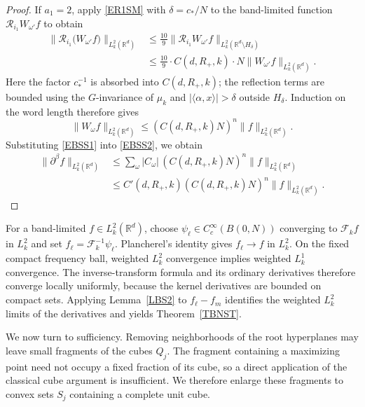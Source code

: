 \documentclass[12pt]{article}
\begin{document}
\begin{proof}
If $a_1=2$, apply \eqref{ER1SM} with $\delta=c_*/N$ to the band-limited function $\mathcal{R}_{i_1}W_{\omega'}f$ to obtain
\begin{align*}
\|\mathcal{R}_{i_1}\big(W_{\omega'} f\big)\|_{L_k^2(\mathbb{R}^d)}
&\le \frac{10}{9}\|\mathcal{R}_{i_1} W_{\omega'}  f\|_{L_k^2(\mathbb{R}^d\setminus H_\delta)} \\
&\le \frac{10}{9}\cdot C(d,R_+,k)\cdot N \|W_{\omega'}  f\|_{L_k^2(\mathbb{R}^d)}.
\end{align*}
Here the factor $c_*^{-1}$ is absorbed into $C(d,R_+,k)$; the reflection terms are bounded using the $G$-invariance of $\mu_k$ and $|\langle\alpha,x\rangle|>\delta$ outside $H_\delta$. Induction on the word length therefore gives
\begin{equation}\label{EBSS1}
\|W_\omega f\|_{L_k^2(\mathbb{R}^d)}\leq (C(d,R_+,k)N)^n\|f\|_{L_k^2(\mathbb{R}^d)}.
\end{equation}
Substituting \eqref{EBSS1} into \eqref{EBSS2}, we obtain
\[
\begin{aligned}
\|\partial^\beta f\|_{L_k^2(\mathbb{R}^d)}&\leq \sum_{\omega}|C_{\omega}|\,(C(d,R_+,k)N)^n\|f\|_{L_k^2(\mathbb{R}^d)}\\
&\leq C'(d,R_+,k)(C(d,R_+,k)N)^n\|f\|_{L_k^2(\mathbb{R}^d)}.
\end{aligned}
\]
\end{proof}

\begin{remark}
For a band-limited $f\in L_k^2(\mathbb{R}^d)$, choose $\psi_\ell\in C_c^\infty(B(0,N))$ converging to $\mathcal{F}_k f$ in $L_k^2$ and set $f_\ell=\mathcal{F}_k^{-1}\psi_\ell$. Plancherel's identity gives $f_\ell\to f$ in $L_k^2$. On the fixed compact frequency ball, weighted $L_k^2$ convergence implies weighted $L_k^1$ convergence. The inverse-transform formula and its ordinary derivatives therefore converge locally uniformly, because the kernel derivatives are bounded on compact sets. Applying Lemma~\ref{LBS2} to $f_\ell-f_m$ identifies the weighted $L_k^2$ limits of the derivatives and yields Theorem~\ref{TBNST}.
\end{remark}

We now turn to sufficiency. Removing neighborhoods of the root hyperplanes may leave small fragments of the cubes $Q_j$. The fragment containing a maximizing point need not occupy a fixed fraction of its cube, so a direct application of the classical cube argument is insufficient. We therefore enlarge these fragments to convex sets $S_j$ containing a complete unit cube.
\end{document}
